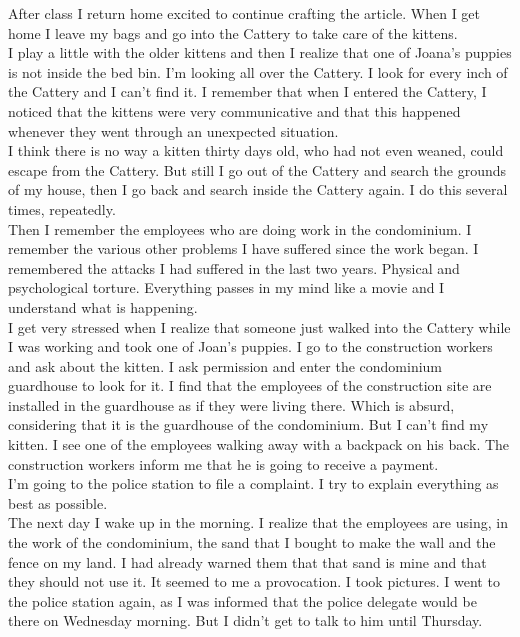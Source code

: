 \documentclass[11pt]{book}
\begin{document}
\noindent After class I return home excited to continue crafting the article. When I get home I leave my bags and go into the Cattery to take care of the kittens. \\

\noindent I play a little with the older kittens and then I realize that one of Joana's puppies is not inside the bed bin. I'm looking all over the Cattery. I look for every inch of the Cattery and I can't find it. I remember that when I entered the Cattery, I noticed that the kittens were very communicative and that this happened whenever they went through an unexpected situation.  \\

\noindent I think there is no way a kitten thirty days old, who had not even weaned, could escape from the Cattery. But still I go out of the Cattery and search the grounds of my house, then I go back and search inside the Cattery again. I do this several times, repeatedly. \\

\noindent Then I remember the employees who are doing work in the condominium. I remember the various other problems I have suffered since the work began. I remembered the attacks I had suffered in the last two years. Physical and psychological torture. Everything passes in my mind like a movie and I understand what is happening. \\

\noindent I get very stressed when I realize that someone just walked into the Cattery while I was working and took one of Joan's puppies. I go to the construction workers and ask about the kitten. I ask permission and enter the condominium guardhouse to look for it. I find that the employees of the construction site are installed in the guardhouse as if they were living there. Which is absurd, considering that it is the guardhouse of the condominium. But I can't find my kitten. I see one of the employees walking away with a backpack on his back. The construction workers inform me that he is going to receive a payment. \\

\noindent I'm going to the police station to file a complaint. I try to explain everything as best as possible. \\

\noindent The next day I wake up in the morning. I realize that the employees are using, in the work of the condominium, the sand that I bought to make the wall and the fence on my land. I had already warned them that that sand is mine and that they should not use it. It seemed to me a provocation. I took pictures. I went to the police station again, as I was informed that the police delegate would be there on Wednesday morning. But I didn't get to talk to him until Thursday. \\
\end{document}
